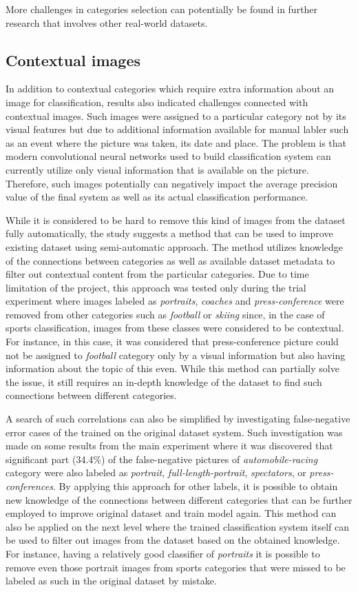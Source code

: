 More challenges in categories selection can potentially be found in further research that involves other real-world datasets.

\subsection{Contextual images}
In addition to contextual categories which require extra information about an image for classification, results also indicated challenges connected with contextual images. Such images were assigned to a particular category not by its visual features but due to additional information available for manual labler such as an event where the picture was taken, its date and place. The problem is that modern convolutional neural networks used to build classification system can currently utilize only visual information that is available on the picture. Therefore, such images potentially can negatively impact the average precision value of the final system as well as its actual classification performance.

While it is considered to be hard to remove this kind of images from the dataset fully automatically, the study suggests a method that can be used to improve existing dataset using semi-automatic approach. The method utilizes knowledge of the connections between categories as well as available dataset metadata to filter out contextual content from the particular categories. Due to time limitation of the project, this approach was tested only during the trial experiment where images labeled as \textit{portraits}, \textit{coaches} and \textit{press-conference} were removed from other categories such as \textit{football} or \textit{skiing} since, in the case of sports classification, images from these classes were considered to be contextual. For instance, in this case, it was considered that press-conference picture could not be assigned to \textit{football} category only by a visual information but also having information about the topic of this even. While this method can partially solve the issue, it still requires an in-depth knowledge of the dataset to find such connections between different categories.

A search of such correlations can also be simplified by investigating false-negative error cases of the trained on the original dataset system. Such investigation was made on some results from the main experiment where it was discovered that significant part (34.4\%) of the false-negative pictures of \textit{automobile-racing} category were also labeled as \textit{portrait}, \textit{full-length-portrait}, \textit{spectators}, or \textit{press-conferences}. By applying this approach for other labels, it is possible to obtain new knowledge of the connections between different categories that can be further employed to improve original dataset and train model again. This method can also be applied on the next level where the trained classification system itself can be used to filter out images from the dataset based on the obtained knowledge. For instance, having a relatively good classifier of \textit{portraits} it is possible to remove even those portrait images from sports categories that were missed to be labeled as such in the original dataset by mistake.

